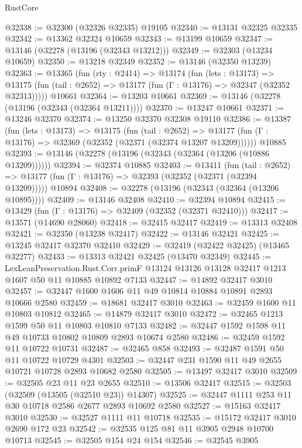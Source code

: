 \begin{lexlean}{RustCore}
\begin{coremodule}
@32338 := @32300 (@32326 @32335) @19105
@32340 := @13131 @32325 @32335
@32342 := @13362 @32324 @10659
@32343 := @13199 @10659
@32347 := @13146 (@32278 (@13196 (@32343 @13212)))
@32349 := @32303 (@13234 @10659)
@32350 := @13218 @32349
@32352 := @13146 (@32350 @13239)
@32363 := @13365
    (fun (rty : @2414) =>
    @13174
      (fun (lets : @13173) =>
      @13175 (fun (tail : @2652) => @13177 (fun (Γ : @13176) => @32347 (@32352 @32313)))))
    @10661
@32364 := @13203 @10661
@32369 := @13146 (@32278 (@13196 (@32343 (@32364 @13211))))
@32370 := @13247 @10661
@32371 := @13246 @32370
@32374 := @13250 @32370 @32308 @19110
@32386 := @13387
    (fun (lets : @13173) =>
    @13175
      (fun (tail : @2652) =>
      @13177 (fun (Γ : @13176) => @32369 (@32352 (@32371 (@32374 @13207 @13209))))))
    @10885
@32393 := @13146 (@32278 (@13196 (@32343 (@32364 (@13206 (@10886 @13209))))))
@32394 := @32374 @10885
@32403 := @13411
    (fun (tail : @2652) => @13177 (fun (Γ : @13176) => @32393 (@32352 (@32371 (@32394 @13209)))))
    @10894
@32408 := @32278 (@13196 (@32343 (@32364 (@13206 @10895))))
@32409 := @13146 @32408
@32410 := @32394 @10894
@32415 := @13429 (fun (Γ : @13176) => @32409 (@32352 (@32371 @32410)))
@32417 := @13571 (@14690 @28060)
@32418 := @32415 @32417
@32419 := @13313 @32408
@32421 := @32350 (@13238 @32417)
@32422 := @13146 @32421
@32425 := @13245 @32417 @32370 @32410
@32429 := @32419 (@32422 @32425) (@13465 @32277)
@32433 := @13313 @32421 @32425 (@13470 @32349)
@32445 := LexLeanPreservation.Rust.Corr.primF
    @13124
    @13126
    @13128
    @32417
    @1213
    @1607
    @50
    @11
    @10885
    @10892
    @7133
@32447 := @14892 @32417 @3010
@32457 := @32447 @1600 @1606 @11 @49 @10814 @10884 @10891 @2893 @10666 @2580
@32459 := @18681 @32417 @3010
@32463 := @32459 @1600 @11 @10803 @10812
@32465 := @14879 @32417 @3010
@32472 := @32465 @1213 @1599 @50 @11 @10803 @10810 @7133
@32482 := @32447 @1592 @1598 @11 @49 @10733 @10802 @10809 @2893 @10674 @2580
@32486 := @32459 @1592 @11 @10722 @10731
@32487 := @32465 @858
@32493 := @32487 @1591 @50 @11 @10722 @10729 @4301
@32503 := @32447 @231 @1590 @11 @49 @2655 @10721 @10728 @2893 @10682 @2580
@32505 := @13497 @32417 @3010
@32509 := @32505 @23 @11 @23 @2655
@32510 := @13506 @32417
@32515 := @32503 (@32509 (@13505 (@32510 @23)) @14307)
@32525 := @32447 @1111 @253 @11 @30 @10718 @2586 @2677 @2893 @10692 @2580
@32527 := @15163 @32417 @3010
@32530 := @32527 @1111 @11 @10718
@32535 := @15172 @32417 @3010 @2690 @172 @23
@32542 := @32535 @125 @81 @11 @3905 @2948 @10700 @10713
@32545 := @32505 @154 @24 @154
@32546 := @32545 @3905

\end{coremodule}
\end{lexlean}
